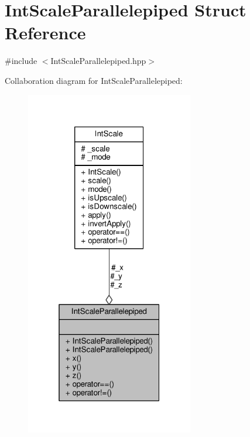 \hypertarget{struct_int_scale_parallelepiped}{\section{Int\-Scale\-Parallelepiped Struct Reference}
\label{struct_int_scale_parallelepiped}
}


{\ttfamily \#include $<$Int\-Scale\-Parallelepiped.\-hpp$>$}



Collaboration diagram for Int\-Scale\-Parallelepiped\-:
\nopagebreak
\begin{figure}[H]
\begin{center}
\leavevmode
\includegraphics[width=208pt]{struct_int_scale_parallelepiped__coll__graph}
\end{center}
\end{figure}
